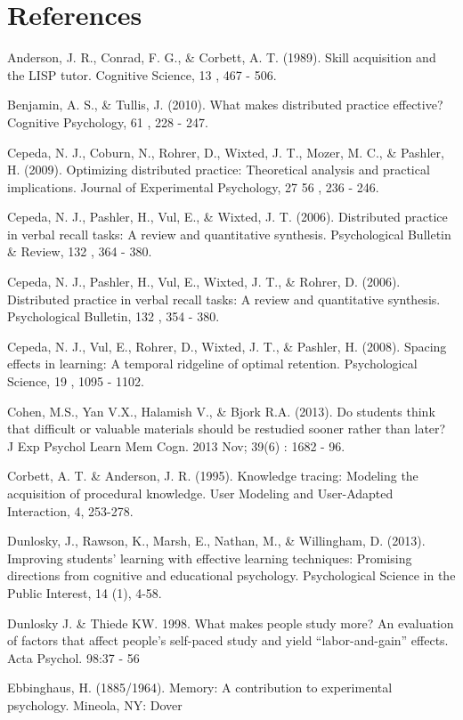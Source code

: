 \documentclass[a4paper,12pt]{article}
\begin{document}
\section*{References}
\begin{hangparas}{.25in}{1}
Anderson, J. R., Conrad, F. G., \& Corbett, A. T. (1989). Skill acquisition and the LISP tutor. Cognitive Science, 13 , 467 - 506.

Benjamin, A. S., \& Tullis, J. (2010). What makes distributed practice effective? Cognitive Psychology, 61 , 228 - 247.

Cepeda, N. J., Coburn, N., Rohrer, D., Wixted, J. T., Mozer, M. C., \& Pashler, H. (2009). Optimizing distributed practice: Theoretical analysis and practical implications. Journal of Experimental Psychology, 27 56 , 236 - 246. 

Cepeda, N. J., Pashler, H., Vul, E., \& Wixted, J. T. (2006). Distributed practice in verbal recall tasks: A review and quantitative synthesis. Psychological Bulletin \& Review, 132 , 364 - 380. 

Cepeda, N. J., Pashler, H., Vul, E., Wixted, J. T., \& Rohrer, D. (2006). Distributed practice in verbal recall tasks: A review and quantitative synthesis. Psychological Bulletin, 132 , 354 - 380. 

Cepeda, N. J., Vul, E., Rohrer, D., Wixted, J. T., \& Pashler, H. (2008). Spacing effects in learning: A temporal ridgeline of optimal retention. Psychological Science, 19 , 1095 - 1102.

Cohen, M.S., Yan V.X., Halamish V., \& Bjork R.A. (2013). Do students think that difficult or valuable materials should be restudied sooner rather than later? J Exp Psychol Learn Mem Cogn. 2013 Nov; 39(6) : 1682 - 96.

Corbett, A. T. \& Anderson, J. R. (1995). Knowledge tracing: Modeling the acquisition of procedural knowledge. User Modeling and User-Adapted Interaction, 4, 253-278.

Dunlosky, J., Rawson, K., Marsh, E., Nathan, M., \& Willingham, D. (2013). Improving students' learning with effective learning techniques: Promising directions from cognitive and educational psychology. Psychological Science in the Public Interest, 14 (1), 4-58.

Dunlosky J. \& Thiede KW. 1998. What makes people study more? An evaluation of factors that affect people's self-paced study and yield ``labor-and-gain'' effects. Acta Psychol. 98:37 - 56

Ebbinghaus, H. (1885/1964). Memory: A contribution to experimental psychology. Mineola, NY: Dover


\end{hangparas}
\end{document}
